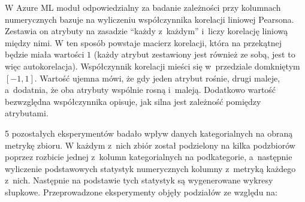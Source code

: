 W Azure ML moduł odpowiedzialny za badanie zależności przy kolumnach numerycznych bazuje na wyliczeniu współczynnika korelacji liniowej Pearsona.
Zestawia on atrybuty na zasadzie ``każdy z~każdym'' i~liczy korelację liniową między nimi.
W ten sposób powstaje macierz korelacji, która na przekątnej będzie miała wartości \(1\) (każdy atrybut zestawiony jest również ze sobą, jest to więc autokorelacja).
Współczynnik korelacji mieści się w~przedziale domkniętym \([-1, 1]\).
Wartość ujemna mówi, że gdy jeden atrybut rośnie, drugi maleje, a~dodatnia, że oba atrybuty wspólnie rosną i~maleją.
Dodatkowo wartość bezwzględna współczynnika opisuje, jak silna jest zależność pomiędzy atrybutami.

5 pozostałych eksperymentów badało wpływ danych kategorialnych na obraną metrykę zbioru.
W każdym z~nich zbiór został podzielony na kilka podzbiorów poprzez rozbicie jednej z~kolumn kategorialnych na podkategorie, a~następnie wyliczenie podstawowych statystyk numerycznych kolumny z~metryką każdego z~nich.
Następnie na podstawie tych statystyk są wygenerowane wykresy słupkowe.
Przeprowadzone eksperymenty objęły podziałów ze względu na:

